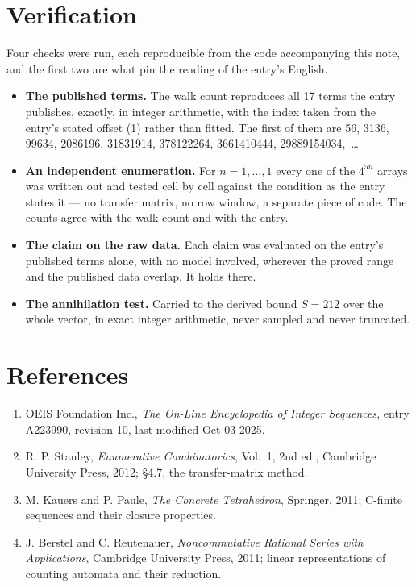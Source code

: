 \documentclass[11pt]{article}
\theoremstyle{definition}
\begin{document}
\section{Verification}

Four checks were run, each reproducible from the code accompanying this note, and the first two are what pin the reading of the entry's English.

\begin{itemize}

\item {\bfseries The published terms.} The walk count reproduces all 17 terms the entry publishes, exactly, in integer arithmetic, with the index taken from the entry's stated offset (1) rather than fitted. The first of them are 56, 3136, 99634, 2086196, 31831914, 378122264, 3661410444, 29889154034,~\dots

\item {\bfseries An independent enumeration.} For $n = 1,\dots,1$ every one of the $4^{5n}$ arrays was written out and tested cell by cell against the condition as the entry states it --- no transfer matrix, no row window, a separate piece of code. The counts agree with the walk count and with the entry.

\item {\bfseries The claim on the raw data.} Each claim was evaluated on the entry's published terms alone, with no model involved, wherever the proved range and the published data overlap. It holds there.

\item {\bfseries The annihilation test.} Carried to the derived bound $S = 212$ over the whole vector, in exact integer arithmetic, never sampled and never truncated.

\end{itemize}

\section{References}

\begin{enumerate}

\item OEIS Foundation Inc., \emph{The On-Line Encyclopedia of Integer Sequences}, entry \href{https://oeis.org/A223990}{A223990}, revision 10, last modified Oct 03 2025.

\item R. P. Stanley, \emph{Enumerative Combinatorics}, Vol.~1, 2nd ed., Cambridge University Press, 2012; \S4.7, the transfer-matrix method.

\item M. Kauers and P. Paule, \emph{The Concrete Tetrahedron}, Springer, 2011; C-finite sequences and their closure properties.

\item J. Berstel and C. Reutenauer, \emph{Noncommutative Rational Series with Applications}, Cambridge University Press, 2011; linear representations of counting automata and their reduction.

\end{enumerate}
\end{document}
